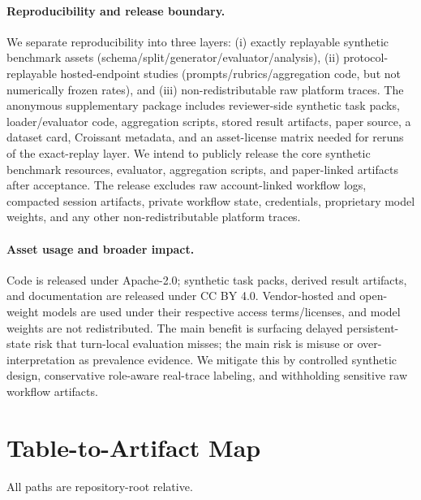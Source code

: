 \paragraph{Reproducibility and release boundary.} We separate reproducibility into three layers: (i) exactly replayable synthetic benchmark assets (schema/split/generator/evaluator/analysis), (ii) protocol-replayable hosted-endpoint studies (prompts/rubrics/aggregation code, but not numerically frozen rates), and (iii) non-redistributable raw platform traces. The anonymous supplementary package includes reviewer-side synthetic task packs, loader/evaluator code, aggregation scripts, stored result artifacts, paper source, a dataset card, Croissant metadata, and an asset-license matrix needed for reruns of the exact-replay layer. We intend to publicly release the core synthetic benchmark resources, evaluator, aggregation scripts, and paper-linked artifacts after acceptance. The release excludes raw account-linked workflow logs, compacted session artifacts, private workflow state, credentials, proprietary model weights, and any other non-redistributable platform traces.

\paragraph{Asset usage and broader impact.} Code is released under Apache-2.0; synthetic task packs, derived result artifacts, and documentation are released under CC BY 4.0. Vendor-hosted and open-weight models are used under their respective access terms/licenses, and model weights are not redistributed. The main benefit is surfacing delayed persistent-state risk that turn-local evaluation misses; the main risk is misuse or over-interpretation as prevalence evidence. We mitigate this by controlled synthetic design, conservative role-aware real-trace labeling, and withholding sensitive raw workflow artifacts.

\clearpage
\section{Table-to-Artifact Map}
\label{app:artifact_map}

All paths are repository-root relative.

